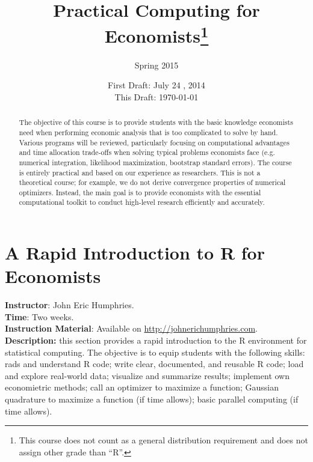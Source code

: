 




\title{\textbf{Practical Computing for Economists}\footnote{This course does not count as a general distribution requirement and does not assign other grade than ``R''. }}
\author{Spring 2015}
\date{First Draft: July 24 , 2014 \\ This Draft: \today}
\maketitle

\begin{abstract}
\noindent The objective of this course is to provide students with the basic knowledge economists need when performing economic analysis that is too complicated to solve by hand. Various programs will be reviewed, particularly focusing on computational advantages and time allocation trade-offs when solving typical problems economists face (e.g. numerical integration, likelihood maximization, bootstrap standard errors). The course is entirely practical and based on our experience as researchers. This is not a theoretical course; for example, we do not derive convergence properties of numerical optimizers. Instead, the main goal is to provide economists with the essential computational toolkit to conduct high-level research efficiently and accurately.
\end{abstract}


\section{A Rapid Introduction to R for Economists}
\noindent \textbf{Instructor}: John Eric Humphries.\\
\noindent \textbf{Time}: Two weeks.\\
\noindent \textbf{Instruction Material}: Available on \href{http://johnerichumphries.com}{http://johnerichumphries.com}.\\
\noindent \textbf{Description:} this section provides a rapid introduction to the R environment for statistical computing. The objective is to equip students with the following skills: rads and understand R code; write clear, documented, and reusable R code; load and explore real-world data; visualize and summarize results; implement own economietric methods; call an optimizer to maximize a function; Gaussian quadrature to maximize a function (if time allows); basic parallel computing (if time allows). 


